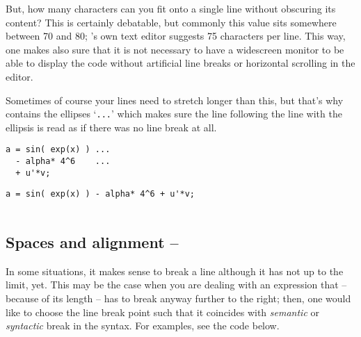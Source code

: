 But, how many characters can you fit onto a single line without obscuring its
content? This is certainly debatable, but commonly this value sits somewhere
between 70 and 80; \matlab{}'s own text editor suggests 75 characters per
line. This way, one makes also sure that it is not necessary to have a
widescreen monitor to be able to display the code without artificial line
breaks or horizontal scrolling in the editor.

Sometimes of course your lines need to stretch longer than this, but that's
why \matlab{} contains the ellipses `\lstinline!...!' which makes sure the
line following the line with the ellipsis is read as if there was no line
break at all.

\hfill
\begin{minipage}[t]{.45\textwidth}
\begin{lstlisting}[framerule=2pt,rulecolor=\color{goodgreen}]
a = sin( exp(x) ) ...
  - alpha* 4^6    ...
  + u'*v;
\end{lstlisting}
\end{minipage}
\hfill
\begin{minipage}[t]{.45\textwidth}
\begin{lstlisting}[framerule=2pt,rulecolor=\color{badred}]
a = sin( exp(x) ) - alpha* 4^6 + u'*v;


\end{lstlisting}
\end{minipage}
\hfill


\subsection{Spaces and alignment -- \cleansymbol\cleansymbol\cleansymbol}\label{paragraph:alignment}
In some situations, it makes sense to break a line although it has not up to the limit, yet. This may be the case when you are dealing with an expression that -- because of its length -- has to break anyway further to the right; then, one would like to choose the line break point such that it coincides with \emph{semantic} or \emph{syntactic} break in the syntax. For examples, see the code below.


